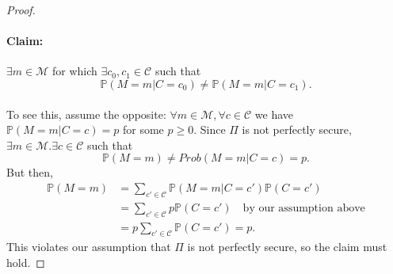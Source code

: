 \documentclass{article}
\theoremstyle{definition}
\theoremstyle{example}
\newcommand{\M}{\mathcal{M}}
\renewcommand{\C}{\mathcal{C}}
\newcommand{\Prob}{\mathbb{P}}
\begin{document}
\begin{proof}
  \paragraph{Claim:} $\exists m \in \M$ for which $\exists c_0, c_1 \in \C$ such
  that
  \[
    \Prob(M = m | C = c_0) \neq \Prob(M = m | C = c_1).
  \]
  \paragraph{} To see this, assume the opposite: $\forall m \in \M, \forall c
  \in \C$ we have $\Prob(M = m | C = c) = p$ for some $p \geq 0$. Since $\Pi$ is
  not perfectly secure, $\exists m \in \M. \exists c \in \C$ such that
  \[
    \Prob(M = m) \neq Prob(M = m | C = c) = p.
  \]
  But then,
  \begin{align*}
    \Prob(M = m) &= \sum_{c' \in \C} \Prob(M = m | C = c')\Prob(C = c') \\
                 &= \sum_{c' \in \C} p\Prob(C = c')\quad\text{by our assumption above} \\
   &= p\sum_{c' \in \C} \Prob(C = c') = p.
  \end{align*}
  This violates our assumption that $\Pi$ is not perfectly secure, so the claim
  must hold.

\end{proof}
\end{document}
